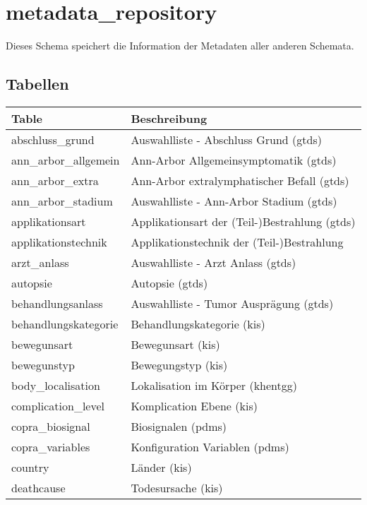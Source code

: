   \section{metadata\_repository}
  Dieses Schema speichert die Information der Metadaten aller anderen Schemata.
  
  \subsection{Tabellen}
  
  \begin{longtable}{||p{6cm}|p{7.8cm}||}
  	\hline Table & Beschreibung \\ \hline \hline
  	abschluss\_grund & Auswahlliste - Abschluss Grund (\ac{gtds}) \\ \hline
  	ann\_arbor\_allgemein & Ann-Arbor Allgemeinsymptomatik (\ac{gtds}) \\ \hline
  	ann\_arbor\_extra & Ann-Arbor extralymphatischer Befall (\ac{gtds}) \\ \hline
  	ann\_arbor\_stadium & Auswahlliste - Ann-Arbor Stadium (\ac{gtds}) \\ \hline
  	applikationsart & Applikationsart der (Teil-)Bestrahlung (\ac{gtds}) \\ \hline
  	applikationstechnik & Applikationstechnik der (Teil-)Bestrahlung\\ \hline
  	arzt\_anlass & Auswahlliste - Arzt Anlass (\ac{gtds})\\ \hline
  	autopsie & Autopsie (\ac{gtds}) \\ \hline
  	behandlungsanlass & Auswahlliste - Tumor Ausprägung (\ac{gtds}) \\ \hline
  	behandlungskategorie & Behandlungskategorie (\ac{kis}) \\ \hline
  	bewegunsart & Bewegunsart (\ac{kis})\\ \hline
  	bewegunstyp & Bewegungstyp (\ac{kis}) \\ \hline
  	body\_localisation & Lokalisation im Körper (\ac{khentgg})\\ \hline
  	complication\_level & Komplication Ebene (\ac{kis}) \\ \hline
  	copra\_biosignal & Biosignalen (\ac{pdms}) \\ \hline
  	copra\_variables & Konfiguration Variablen (\ac{pdms}) \\ \hline
  	country & Länder (\ac{kis}) \\ \hline
  	deathcause & Todesursache (\ac{kis}) \\ \hline

\end{longtable}
